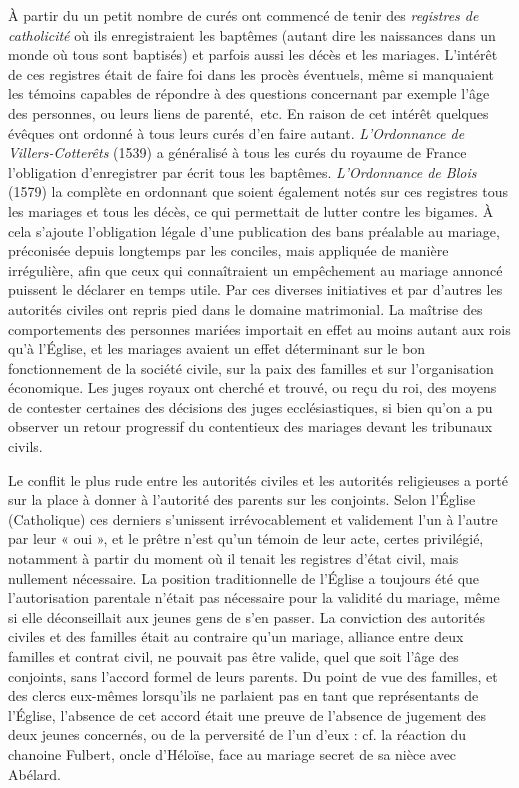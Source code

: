  À partir du  un petit nombre de curés ont commencé de tenir des \emph{registres de catholicité} où ils enregistraient les baptêmes (autant dire les naissances dans un monde où tous sont baptisés) et parfois aussi les décès et les mariages. L'intérêt de ces registres était de faire foi dans les procès éventuels, même si manquaient les témoins capables de répondre à des questions concernant par exemple l'âge des personnes, ou leurs liens de parenté,~etc. En raison de cet intérêt quelques évêques ont ordonné à tous leurs curés d'en faire autant. \emph{L'Ordonnance de Villers-Cotterêts} (1539) a généralisé à tous les curés du royaume de France l'obligation d'enregistrer par écrit tous les baptêmes. \emph{L'Ordonnance de Blois} (1579) la complète en ordonnant que soient également notés sur ces registres tous les mariages et tous les décès, ce qui permettait de lutter contre les bigames. À cela s'ajoute l'obligation légale d'une publication des bans préalable au mariage, préconisée depuis longtemps par les conciles, mais appliquée de manière irrégulière, afin que ceux qui connaîtraient un empêchement au mariage annoncé puissent le déclarer en temps utile. Par ces diverses initiatives et par d'autres les autorités civiles ont repris pied dans le domaine matrimonial. La maîtrise des comportements des personnes mariées importait en effet au moins autant aux rois qu'à l'Église, et les mariages avaient un effet déterminant sur le bon fonctionnement de la société civile, sur la paix des familles et sur l'organisation économique. Les juges royaux ont cherché et trouvé, ou reçu du roi, des moyens de contester certaines des décisions des juges ecclésiastiques, si bien qu'on a pu observer un retour progressif du contentieux des mariages devant les tribunaux civils. 

 Le conflit le plus rude entre les autorités civiles et les autorités religieuses a porté sur la place à donner à l'autorité des parents sur les conjoints. Selon l'Église (Catholique) ces derniers s'unissent irrévocablement et validement l'un à l'autre par leur « oui », et le prêtre n'est qu'un témoin de leur acte, certes privilégié, notamment à partir du moment où il tenait les registres d'état civil, mais nullement nécessaire. La position traditionnelle de l'Église a toujours été que l'autorisation parentale n'était pas nécessaire pour la validité du mariage, même si elle déconseillait aux jeunes gens de s'en passer. La conviction des autorités civiles et des familles était au contraire qu'un mariage, alliance entre deux familles et contrat civil, ne pouvait pas être valide, quel que soit l'âge des conjoints, sans l'accord formel de leurs parents. Du point de vue des familles, et des clercs eux-mêmes lorsqu'ils ne parlaient pas en tant que représentants de l'Église, l'absence de cet accord était une preuve de l'absence de jugement des deux jeunes concernés, ou de la perversité de l'un d'eux : cf. la réaction du chanoine Fulbert, oncle d'Héloïse, face au mariage secret de sa nièce avec Abélard. 

